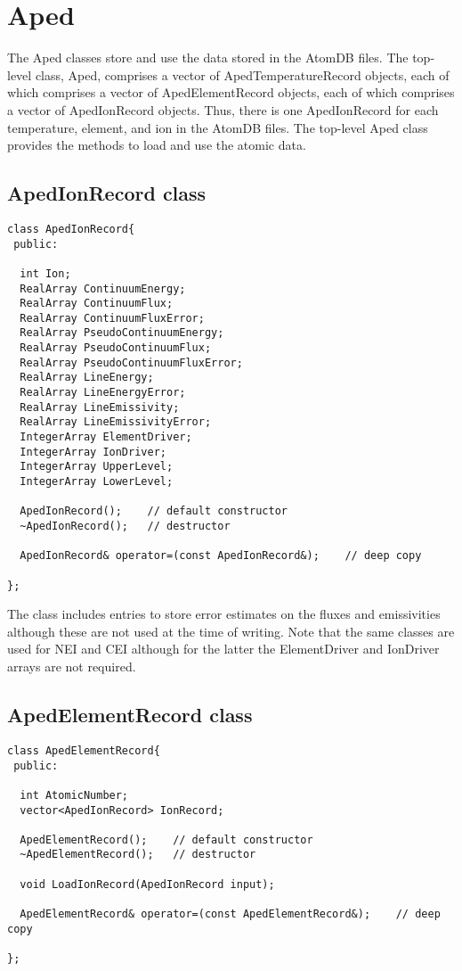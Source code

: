 \documentclass[11pt]{book}
\begin{document}
\chapter{Aped}

The Aped classes store and use the data stored in the AtomDB
files. The top-level class, Aped, comprises a vector of
ApedTemperatureRecord objects, each of which comprises a vector of
ApedElementRecord objects, each of which comprises a vector of
ApedIonRecord objects. Thus, there is one ApedIonRecord for
each temperature, element, and ion in the AtomDB files. The top-level Aped
class provides the methods to load and use the atomic data.

\section{ApedIonRecord class}

\begin{verbatim}
class ApedIonRecord{
 public:

  int Ion;
  RealArray ContinuumEnergy;
  RealArray ContinuumFlux;
  RealArray ContinuumFluxError;
  RealArray PseudoContinuumEnergy;
  RealArray PseudoContinuumFlux;
  RealArray PseudoContinuumFluxError;
  RealArray LineEnergy;
  RealArray LineEnergyError;
  RealArray LineEmissivity;
  RealArray LineEmissivityError;
  IntegerArray ElementDriver;
  IntegerArray IonDriver;
  IntegerArray UpperLevel;
  IntegerArray LowerLevel;

  ApedIonRecord();    // default constructor
  ~ApedIonRecord();   // destructor

  ApedIonRecord& operator=(const ApedIonRecord&);    // deep copy

};
\end{verbatim}

The class includes entries to store error estimates on the fluxes and
emissivities although these are not used at the time of writing. Note
that the same classes are used for NEI and CEI although for the latter the
ElementDriver and IonDriver arrays are not required.

\section{ApedElementRecord class}

\begin{verbatim}
class ApedElementRecord{
 public:

  int AtomicNumber;
  vector<ApedIonRecord> IonRecord;

  ApedElementRecord();    // default constructor
  ~ApedElementRecord();   // destructor

  void LoadIonRecord(ApedIonRecord input);

  ApedElementRecord& operator=(const ApedElementRecord&);    // deep copy

};
\end{verbatim}
\end{document}
